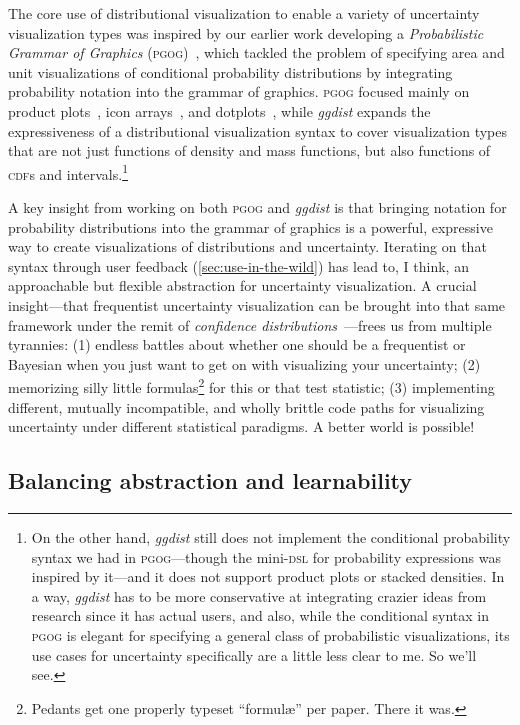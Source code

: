 \documentclass[journal]{vgtc}              %
\begin{document}
The core use of distributional visualization to enable a variety of uncertainty visualization types was inspired by our earlier work developing a \textit{Probabilistic Grammar of Graphics} (\textsc{pgog})~\cite{pu2020probabilistic}, which tackled the problem of specifying area and unit visualizations of conditional probability distributions by integrating probability notation into the grammar of graphics. \textsc{pgog} focused mainly on product plots~\cite{wickham2011product}, icon arrays~\cite{ancker2006design}, and dotplots~\cite{wilkinson1999dot}, while \textit{ggdist} expands the expressiveness of a distributional visualization syntax to cover visualization types that are not just functions of density and mass functions, but also functions of \textsc{cdf}s and intervals.\footnote{On the other hand, \textit{ggdist} still does not implement the conditional probability syntax we had in \textsc{pgog}---though the mini-\textsc{dsl} for probability expressions was inspired by it---and it does not support product plots or stacked densities. In a way, \textit{ggdist} has to be more conservative at integrating crazier ideas from research since it has actual users, and also, while the conditional syntax in \textsc{pgog} is elegant for specifying a general class of probabilistic visualizations, its use cases for uncertainty specifically are a little less clear to me. So we'll see.} 

A key insight from working on both \textsc{pgog} and \textit{ggdist} is that bringing notation for probability distributions into the grammar of graphics is a powerful, expressive way to create visualizations of distributions and uncertainty. Iterating on that syntax through user feedback 
(\cref{sec:use-in-the-wild}) has lead to, I think, an approachable but flexible abstraction for uncertainty visualization. A crucial insight---that frequentist uncertainty visualization can be brought into that same framework under the remit of \textit{confidence distributions}~\cite{xie2013confidence}---frees us from multiple tyrannies: (1) endless battles about whether one should be a frequentist or Bayesian when you just want to get on with visualizing your uncertainty; (2) memorizing silly little formulas\footnote{Pedants get one properly typeset ``formul\ae'' per paper. There it was.} for this or that test statistic; (3) implementing different, mutually incompatible, and wholly brittle code paths for visualizing uncertainty under different statistical paradigms. A better world is possible!

\subsection{Balancing abstraction and learnability}
\end{document}

